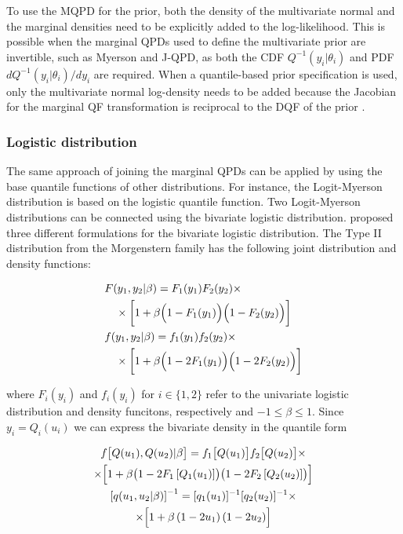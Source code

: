 \documentclass[
  fleqn,
  deca,
  blindrev
]{informs4}
\begin{document}
To use the MQPD for the prior, both the density of the multivariate
normal and the marginal densities need to be explicitly added to the
log-likelihood. This is possible when the marginal QPDs used to define
the multivariate prior are invertible, such as Myerson and J-QPD, as
both the CDF \(Q^{-1}(y_i\vert\theta_i)\) and PDF
\(dQ^{-1}(y_i\vert\theta_i)/dy_i\) are required. When a quantile-based
prior specification is used, only the multivariate normal log-density
needs to be added because the Jacobian for the marginal QF
transformation is reciprocal to the DQF of the prior
\citep{perepolkin2023TenetsQuantilebasedInference}.

\subsubsection{Logistic distribution}\label{logistic-distribution}

The same approach of joining the marginal QPDs can be applied by using
the base quantile functions of other distributions. For instance, the
Logit-Myerson distribution \citep{wilson2023ReconciliationExpertPriors}
is based on the logistic quantile function. Two Logit-Myerson
distributions can be connected using the bivariate logistic
distribution. \citet{gumbel1961BivariateLogisticDistributions} proposed
three different formulations for the bivariate logistic distribution.
The Type II distribution from the Morgenstern family
\citep{sajeevkumar2014EstimationParameterMorgenstern, basikhasteh2021BayesianEstimationMorgenstern}
has the following joint distribution and density functions:

\[
\begin{aligned}
&F(y_1,y_2\vert\beta)=F_1(y_1)F_2(y_2)\times\\
&\quad \times \biggl[1+\beta\Bigl(1-F_1(y_1)\Bigr)\Bigl(1-F_2(y_2)\Bigr)\biggr]\\
&f(y_1,y_2\vert\beta)=f_1(y_1)f_2(y_2)\times\\
&\quad \times \biggl[1+\beta\Bigl(1-2F_1(y_1)\Bigr)\Bigl(1-2F_2(y_2)\Bigr)\biggr]
\end{aligned}
\]

where \(F_i(y_i)\) and \(f_i(y_i)\) for \(i\in\{1,2\}\) refer to the
univariate logistic distribution and density funcitons, respectively and
\(-1\leq\beta\leq1\). Since \(y_i=Q_i(u_i)\) we can express the
bivariate density in the quantile form

\[
\begin{gathered}
f\bigl[Q(u_1),Q(u_2)\vert\beta\bigr]=f_1\bigl[Q(u_1)\bigr]f_2\bigl[Q(u_2)\bigr]\times\\
\times \Bigl[1+\beta\bigl(1-2F_1\left[Q_1(u_1)\right]\bigr)\bigl(1-2F_2\left[Q_2(u_2)\right]\bigr)\Bigr]\\
\left[q(u_1,u_2\vert\beta)\right]^{-1}=[q_1(u_1)]^{-1}[q_2(u_2)]^{-1} \times\\
\times \Bigl[1+\beta \left(1-2u_1\right)\left(1-2u_2\right)\Bigr]
\end{gathered}
\]
\end{document}
